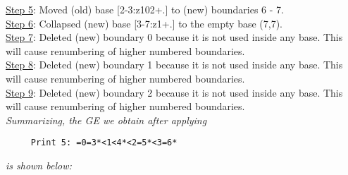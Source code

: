 \documentclass[final]{article}
\begin{document}
{\underline{Step 5}:} Moved (old) base [2-3:z102+.]  to (new) boundaries 6 - 7.\\
{\underline{Step 6}:} Collapsed (new) base [3-7:z1+.]  to the empty base (7,7).
\\
{\underline{Step 7}:} Deleted (new) boundary 0 because it is not used inside any base.  This will cause renumbering of higher numbered boundaries.
\\
{\underline{Step 8}:} Deleted (new) boundary 1 because it is not used inside any base.  This will cause renumbering of higher numbered boundaries.
\\
{\underline{Step 9}:} Deleted (new) boundary 2 because it is not used inside any base.  This will cause renumbering of higher numbered boundaries.
\\[0.1in]
{\em Summarizing, the GE we obtain after applying}
\begin{verbatim}
     Print 5: =0=3*<1<4*<2=5*<3=6*
\end{verbatim}
{\em is shown below:}
\end{document}
